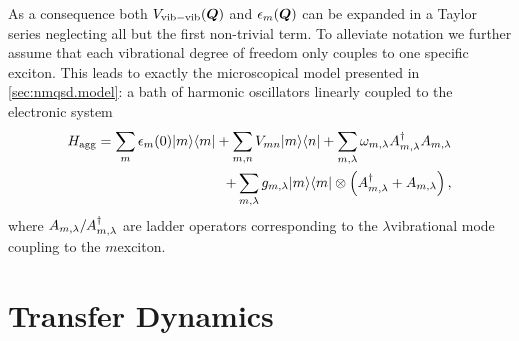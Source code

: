 As a consequence both $V_\mathrm{vib-vib}(\boldsymbol{Q})$ and $\epsilon_m(\boldsymbol{Q})$ can be expanded in a Taylor series neglecting all but the first non-trivial term.
To alleviate notation we further assume that each vibrational degree of freedom only couples to one specific exciton.
This leads to exactly the microscopical model presented in \autoref{sec:nmqsd.model}: a bath of harmonic oscillators linearly coupled to the electronic system
\begin{align*}
  H_\mathrm{agg} =
  \sum_m \epsilon_m(0) | m \rangle\langle m | + \sum_{m,n} V_{mn} | m \rangle\langle n | + \sum_{m, \lambda} \omega_{m, \lambda} A^\dagger_{m, \lambda} A_{m, \lambda} \\
  + \sum_{m, \lambda} g_{m, \lambda} | m \rangle\langle m | \otimes \left( A^\dagger_{m, \lambda} + A_{m, \lambda} \right),
\end{align*}
where $A_{m, \lambda}/A^\dagger_{m, \lambda}$ are ladder operators corresponding to the $\lambda$\th vibrational mode coupling to the $m$\th exciton.



\section{Transfer Dynamics }
\label{sec:app.fmo}

